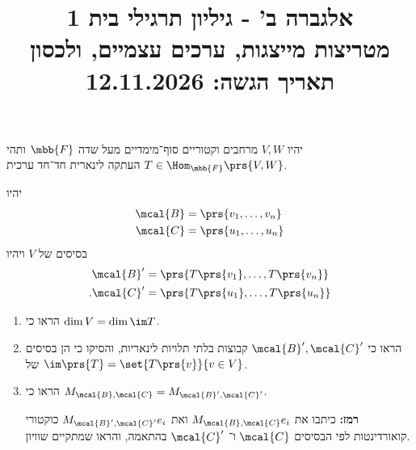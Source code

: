 \documentclass[a4paper,10pt,twoside,openany]{article}
\title{
אלגברה ב' - גיליון תרגילי בית 1 \\
מטריצות מייצגות, ערכים עצמיים, ולכסון
\\
\vspace{1cm}
\large{תאריך הגשה: 12.11.2026}
}
\date{}
\begin{document}
\maketitle

\vspace{-15pt}

\begin{exercise}
יהיו
$V,W$
מרחבים וקטוריים סוף־מימדיים מעל שדה
$\mbb{F}$
ותהי
$T \in \Hom_{\mbb{F}}\prs{V,W}$
העתקה לינארית חד־חד ערכית.

יהיו
\begin{align*}
\mcal{B} &= \prs{v_1, \ldots, v_n} \\
\mcal{C} &= \prs{u_1, \ldots, u_n}
\end{align*}
בסיסים של
$V$
ויהיו
\begin{align*}
\mcal{B}' &= \prs{T\prs{v_1}, \ldots, T\prs{v_n}} \\
\text{.} \mcal{C}' &= \prs{T\prs{u_1}, \ldots, T\prs{u_n}}
\end{align*}

\begin{enumerate}
\item
הראו כי
$\dim V = \dim \im T$.

\item הראו כי
$\mcal{B}', \mcal{C}'$
קבוצות בלתי תלויות לינאריות, והסיקו כי הן בסיסים של
$\im\prs{T} = \set{T\prs{v}}{v \in V}$.

\item
הראו כי
$M_{\mcal{B},\mcal{C}} = M_{\mcal{B}',\mcal{C}'}$.

\textbf{רמז:}
כיתבו את
$M_{\mcal{B},\mcal{C}} e_i$
ואת
$M_{\mcal{B}',\mcal{C}'} e_i$
כוקטורי קואורדינטות לפי הבסיסים
$\mcal{C}$
ו־%
$\mcal{C}'$
בהתאמה, והראו שמתקיים שוויון.
\end{enumerate}
\end{exercise}
\end{document}
